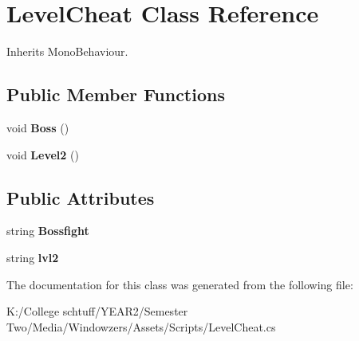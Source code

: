 \hypertarget{class_level_cheat}{}\section{Level\+Cheat Class Reference}
\label{class_level_cheat}


Inherits Mono\+Behaviour.

\subsection*{Public Member Functions}
\begin{DoxyCompactItemize}
\item 
\mbox{\label{class_level_cheat_acb20d5bd9a9df623d1a5ddb8ec68a306}} 
void {\bfseries Boss} ()
\item 
\mbox{\label{class_level_cheat_a288f789bb6d907b36f34684fd0abdee4}} 
void {\bfseries Level2} ()
\end{DoxyCompactItemize}
\subsection*{Public Attributes}
\begin{DoxyCompactItemize}
\item 
\mbox{\label{class_level_cheat_afb57b2470cc2d5ac9db4a48d0f33293c}} 
string {\bfseries Bossfight}
\item 
\mbox{\label{class_level_cheat_aff80a1b51c797271a313f0d446b47921}} 
string {\bfseries lvl2}
\end{DoxyCompactItemize}


The documentation for this class was generated from the following file\+:\begin{DoxyCompactItemize}
\item 
K\+:/\+College schtuff/\+Y\+E\+A\+R2/\+Semester Two/\+Media/\+Windowzers/\+Assets/\+Scripts/Level\+Cheat.\+cs\end{DoxyCompactItemize}
